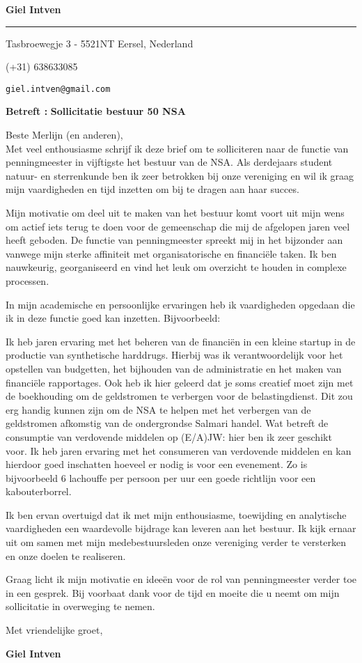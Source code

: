 \documentclass[12pt]{article}
\newcommand{\firstname}{Giel Intven}
\newcommand{\mainColor}{blueSky} %
\newlength{\spacebox}
\newcommand{\shspace}{\hspace*{0.8em}}
\newcommand{\svspace}{\vspace*{0.5em}}
\newcommand{\mvspace}{\vspace*{1.5em}}
\newcommand{\negmvspace}{\vspace*{-1em}}
\newcommand{\userInfo}[4]{
    \begin{flushleft}
        \color{\mainColor}
        \Huge
        \textbf{\MakeUppercase{\lastname}}
        \color{black}
        \textbf{\firstname}
        \color{\mainColor}
        \noindent\rule{19.1cm}{0.8pt}
        \color{grayShy}
        \small
        \par
        \parbox{7\spacebox} {
            \faMap \shspace #1 - #2 \par \svspace
            \faPhone \shspace #3 \par \svspace
            \faEnvelopeOpen \shspace \texttt{#4} \par \svspace
        }
        \color{\mainColor}
        \mvspace
    \end{flushleft}
    \negmvspace
}
\newcommand{\object}[1]{
    \small
    \color{\mainColor} \textbf{Betreft :} \color{black} \textbf{#1} \par
}
\newcommand{\content}[2]{
    \mvspace
    \begin{flushleft}
        \parbox{10.3\spacebox}{
          #1\par
          \svspace
          #2
        }\par
    \end{flushleft}
}
\newcommand{\signature}{
    \svspace
    \parbox{3\spacebox}{
      Met vriendelijke groet,\par
      \svspace \hspace{-0.3em}
      \textbf{\color{\mainColor} \MakeUppercase{\lastname} \color{black} \firstname}\par
      \svspace \svspace
      \Huge \faPenNib\par
    }\par
}
\begin{document}
\selectfont
\userInfo{Tasbroewegje 3}{5521NT Eersel, Nederland}{(+31) 638633085}{giel.intven@gmail.com}

\object{Sollicitatie bestuur 50 NSA}
\content{
  Beste Merlijn (en anderen), \\

Met veel enthousiasme schrijf ik deze brief om te solliciteren naar de functie van penningmeester in vijftigste het bestuur van de NSA. Als derdejaars student natuur- en sterrenkunde ben ik zeer betrokken bij onze vereniging en wil ik graag mijn vaardigheden en tijd inzetten om bij te dragen aan haar succes.

Mijn motivatie om deel uit te maken van het bestuur komt voort uit mijn wens om actief iets terug te doen voor de gemeenschap die mij de afgelopen jaren veel heeft geboden. De functie van penningmeester spreekt mij in het bijzonder aan vanwege mijn sterke affiniteit met organisatorische en financiële taken. Ik ben nauwkeurig, georganiseerd en vind het leuk om overzicht te houden in complexe processen.

In mijn academische en persoonlijke ervaringen heb ik vaardigheden opgedaan die ik in deze functie goed kan inzetten. Bijvoorbeeld:

Ik heb jaren ervaring met het beheren van de financiën in een kleine startup in de productie van synthetische harddrugs. Hierbij was ik verantwoordelijk voor het opstellen van budgetten, het bijhouden van de administratie en het maken van financiële rapportages. Ook heb ik hier geleerd dat je soms creatief moet zijn met de boekhouding om de geldstromen te verbergen voor de belastingdienst. Dit zou erg handig kunnen zijn om de NSA te helpen met het verbergen van de geldstromen afkomstig van de ondergrondse Salmari handel.
Wat betreft de consumptie van verdovende middelen op (E/A)JW: hier ben ik zeer geschikt voor. Ik heb jaren ervaring met het consumeren van verdovende middelen en kan hierdoor goed inschatten hoeveel er nodig is voor een evenement. Zo is bijvoorbeeld 6 lachouffe per persoon per uur een goede richtlijn voor een kabouterborrel.

Ik ben ervan overtuigd dat ik met mijn enthousiasme, toewijding en analytische vaardigheden een waardevolle bijdrage kan leveren aan het bestuur. Ik kijk ernaar uit om samen met mijn medebestuursleden onze vereniging verder te versterken en onze doelen te realiseren.

Graag licht ik mijn motivatie en ideeën voor de rol van penningmeester verder toe in een gesprek. Bij voorbaat dank voor de tijd en moeite die u neemt om mijn sollicitatie in overweging te nemen.
}
\signature
\end{document}
